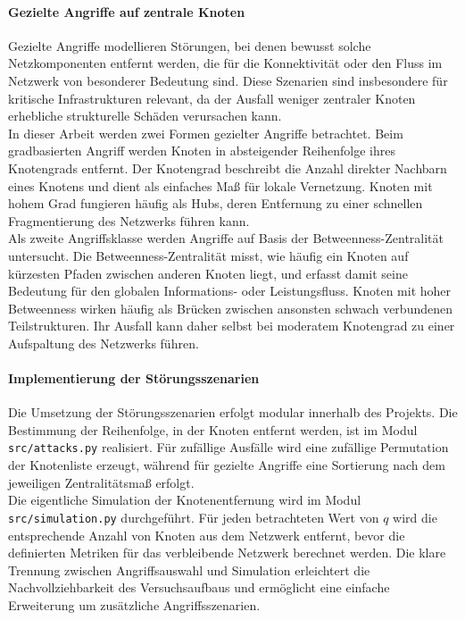 \documentclass[14pt,a4paper]{scrartcl}
\begin{document}
\paragraph{Gezielte Angriffe auf zentrale Knoten}
Gezielte Angriffe modellieren Störungen, bei denen bewusst solche
Netzkomponenten entfernt werden, die für die Konnektivität oder den Fluss im
Netzwerk von besonderer Bedeutung sind. Diese Szenarien sind insbesondere für
kritische Infrastrukturen relevant, da der Ausfall weniger zentraler Knoten
erhebliche strukturelle Schäden verursachen kann.\\
In dieser Arbeit werden zwei Formen gezielter Angriffe betrachtet. Beim
gradbasierten Angriff werden Knoten in absteigender Reihenfolge ihres
Knotengrads entfernt. Der Knotengrad beschreibt die Anzahl direkter Nachbarn
eines Knotens und dient als einfaches Maß für lokale Vernetzung. Knoten mit
hohem Grad fungieren häufig als Hubs, deren Entfernung zu einer schnellen
Fragmentierung des Netzwerks führen kann.\\
Als zweite Angriffsklasse werden Angriffe auf Basis der Betweenness-Zentralität
untersucht. Die Betweenness-Zentralität misst, wie häufig ein
Knoten auf kürzesten Pfaden zwischen anderen Knoten liegt, und erfasst damit
seine Bedeutung für den globalen Informations- oder Leistungsfluss. Knoten mit
hoher Betweenness wirken häufig als Brücken zwischen ansonsten schwach
verbundenen Teilstrukturen. Ihr Ausfall kann daher selbst bei moderatem
Knotengrad zu einer Aufspaltung des Netzwerks führen.

\paragraph{Implementierung der Störungsszenarien}
Die Umsetzung der Störungsszenarien erfolgt modular innerhalb des Projekts.
Die Bestimmung der Reihenfolge, in der Knoten entfernt werden, ist im Modul
\texttt{src/attacks.py} realisiert. Für zufällige Ausfälle wird eine zufällige
Permutation der Knotenliste erzeugt, während für gezielte Angriffe eine
Sortierung nach dem jeweiligen Zentralitätsmaß erfolgt.\\
Die eigentliche Simulation der Knotenentfernung wird im Modul
\texttt{src/simulation.py} durchgeführt. Für jeden betrachteten Wert von $q$
wird die entsprechende Anzahl von Knoten aus dem Netzwerk entfernt, bevor die
definierten Metriken für das verbleibende Netzwerk berechnet werden. Die klare
Trennung zwischen Angriffsauswahl und Simulation erleichtert die
Nachvollziehbarkeit des Versuchsaufbaus und ermöglicht eine einfache
Erweiterung um zusätzliche Angriffsszenarien.
\end{document}
